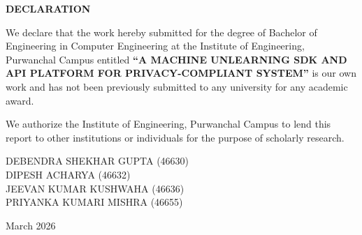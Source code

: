 \begin{center}
{\large\textbf{DECLARATION}}
\end{center}

\begin{flushleft}
\justifying
We declare that the work hereby submitted for the degree of Bachelor of Engineering in Computer Engineering at the Institute of Engineering, Purwanchal Campus entitled \textbf{``A MACHINE UNLEARNING SDK AND API PLATFORM FOR PRIVACY-COMPLIANT SYSTEM''} is our own work and has not been previously submitted to any university for any academic award.

\vspace{0.3cm}
\noindent We authorize the Institute of Engineering, Purwanchal Campus to lend this report to other institutions or individuals for the purpose of scholarly research.

\vspace{1cm}
\noindent DEBENDRA SHEKHAR GUPTA (46630)\\
\noindent DIPESH ACHARYA (46632)\\
\noindent JEEVAN KUMAR KUSHWAHA (46636)\\
\noindent PRIYANKA KUMARI MISHRA (46655)

\vspace{2cm}
\noindent March 2026
\end{flushleft}
